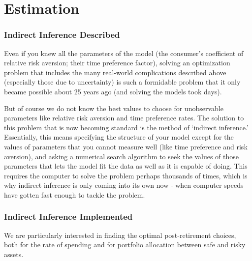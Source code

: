 \documentclass{article}
\begin{document}
\section{Estimation}

\subsubsection{Indirect Inference Described}

Even if you knew all the parameters of the model (the consumer's coefficient of relative risk aversion; their time preference factor), solving an optimization problem that includes the many real-world complications described above (especially those due to uncertainty) is such a formidable problem that it only became possible about 25 years ago (and solving the models took days).

But of course we do not know the best values to choose for unobservable parameters like relative risk aversion and time preference rates. The solution to this problem that is now becoming standard is the method of `indirect inference.' Essentially, this means specifying the structure of your model except for the values of parameters that you cannot measure well (like time preference and risk aversion), and asking a numerical search algorithm to seek the values of those parameters that lets the model fit the data as well as it is capable of doing. This requires the computer to solve the problem perhaps thousands of times, which is why indirect inference is only coming into its own now - when computer speeds have gotten fast enough to tackle the problem.

\subsubsection{Indirect Inference Implemented}

We are particularly interested in finding the optimal post-retirement choices, both for the rate of spending and for portfolio allocation between safe and risky assets.
\end{document}
